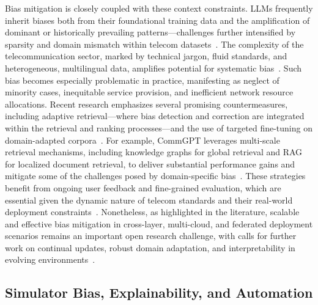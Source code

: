 \documentclass[sigconf]{acmart}
\begin{document}
Bias mitigation is closely coupled with these context constraints. LLMs frequently inherit biases both from their foundational training data and the amplification of dominant or historically prevailing patterns—challenges further intensified by sparsity and domain mismatch within telecom datasets~\cite{ref7,ref9,ref21}. The complexity of the telecommunication sector, marked by technical jargon, fluid standards, and heterogeneous, multilingual data, amplifies potential for systematic bias~\cite{ref7,ref22,ref26}. Such bias becomes especially problematic in practice, manifesting as neglect of minority cases, inequitable service provision, and inefficient network resource allocations. Recent research emphasizes several promising countermeasures, including adaptive retrieval—where bias detection and correction are integrated within the retrieval and ranking processes—and the use of targeted fine-tuning on domain-adapted corpora~\cite{ref20,ref21,ref22,ref28}. For example, CommGPT leverages multi-scale retrieval mechanisms, including knowledge graphs for global retrieval and RAG for localized document retrieval, to deliver substantial performance gains and mitigate some of the challenges posed by domain-specific bias~\cite{ref21}. These strategies benefit from ongoing user feedback and fine-grained evaluation, which are essential given the dynamic nature of telecom standards and their real-world deployment constraints~\cite{ref20,ref22}. Nonetheless, as highlighted in the literature, scalable and effective bias mitigation in cross-layer, multi-cloud, and federated deployment scenarios remains an important open research challenge, with calls for further work on continual updates, robust domain adaptation, and interpretability in evolving environments~\cite{ref16,ref26,ref37}.

\subsection{Simulator Bias, Explainability, and Automation}
\end{document}
